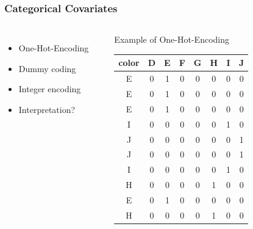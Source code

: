 \documentclass[
    utf8,
    aspectratio=169
]{beamer}  %
\begin{document}
\begin{frame}
	\frametitle{Categorical Covariates}
	\begin{columns}[onlytextwidth]
		\begin{itemize}
			\item One-Hot-Encoding
			\item Dummy coding
			\item Integer encoding
			\item Interpretation?
		\end{itemize}
	
		\vspace{1cm}
	
		\begin{example}
		\end{example}
	
		\begin{block}{\centering Example of One-Hot-Encoding}
			\begin{small}
				\begin{table}
					\begin{tabular}{cccccccc}
						\hline
						   color& D& E& F &G&H &I &J \\
				  		\hline
						E  &   0  &   1  &   0  &   0  &   0  &   0  &   0 \\
						E  &   0  &   1  &   0  &   0  &   0  &   0  &   0 \\
						E  &   0  &   1  &   0  &   0  &   0  &   0  &   0 \\
						I  &   0  &   0  &   0  &   0  &   0  &   1  &   0 \\
						J  &   0  &   0  &   0  &   0  &   0  &   0  &   1 \\
						J  &   0  &   0  &   0  &   0  &   0  &   0  &   1 \\
						I  &   0  &   0  &   0  &   0  &   0  &   1  &   0 \\
						H  &   0  &   0  &   0  &   0  &   1  &   0  &   0 \\
						E  &   0  &   1  &   0  &   0  &   0  &   0  &   0 \\
						H  &   0  &   0  &   0  &   0  &   1  &   0  &   0 \\
				     	\hline
					\end{tabular}
				\end{table}
			\end{small}
		\end{block}
	\end{columns}
\end{frame}
\end{document}

